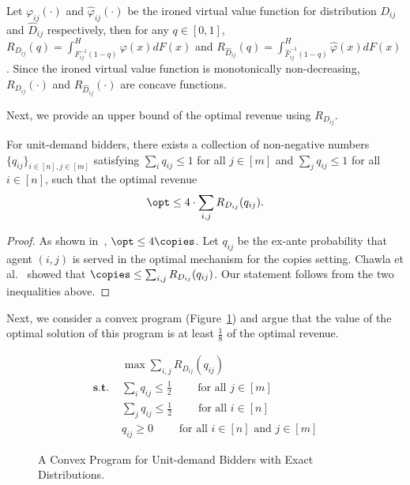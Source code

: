 
\begin{lemma}
	Let ${\varphi}_{ij}(\cdot)$ and $\hat{\varphi}_{ij}(\cdot)$ be the ironed virtual value function for distribution $D_{ij}$ and $\hat{D}_{ij}$ respectively, then for any $q\in [0,1]$, ${R}_{D_{ij}}(q) = \int_{{F}^{-1}_{ij}(1-q)}^H {\varphi}(x) dF(x)$ and $R_{\hat{D}_{ij}}(q) = \int_{\hat{F}^{-1}_{ij}(1-q)}^H \hat{\varphi}(x) dF(x)$. Since the ironed virtual value function is monotonically non-decreasing, ${R}_{D_{ij}}(\cdot)$ and $R_{\hat{D}_{ij}}(\cdot)$ are concave functions. 
\end{lemma}

Next, we provide an upper bound of the optimal revenue using $R_{D_{ij}}$.
\begin{lemma}\label{lem:UB for UD rev}
For unit-demand bidders, there exists a collection of non-negative numbers $\{q_{ij}\}_{i\in[n], j\in[m]}$ satisfying $\sum_i q_{ij}\leq 1$ for all $j\in [m]$ and $\sum_j q_{ij}\leq 1$ for all $i\in [n]$, such that the optimal revenue $$\opt\leq 4\cdot \sum_{i,j} R_{D_{ij}}(q_{ij}).$$
\end{lemma}
\begin{proof}
As shown in~\cite{CaiDW16}, $\opt\leq 4 \copies$. Let $q_{ij}$ be the ex-ante probability that agent $(i,j)$ is served in the optimal mechanism for the copies setting. Chawla et al.~\cite{ChawlaHMS10} showed that $\copies\leq \sum_{i,j} R_{D_{ij}}(q_{ij})$. Our statement follows from the two inequalities above.\end{proof}

Next, we consider a convex program (Figure~\ref{fig:CP unit demand}) and argue that the value of the optimal solution of this program is at least $\frac{1}{8}$ of the optimal revenue.
\begin{figure}[ht]
\begin{minipage}{\textwidth} 
\begin{align*}\label{prog:convex ud}
&\max \sum_{i,j} R_{D_{ij}}(q_{ij})\\
\textbf{s.t. }& \sum_i q_{ij}\leq \frac{1}{2}\qquad \text{ for all $j\in[m]$}\\
& \sum_j q_{ij}\leq \frac{1}{2}\qquad \text{ for all $i\in[n]$}\\
& q_{ij}\geq 0\qquad \text{ for all $i\in[n]$ and $j\in[m]$}
\end{align*}
\end{minipage}
\caption{A Convex Program for Unit-demand Bidders with Exact Distributions.}
\label{fig:CP unit demand}
\end{figure}

